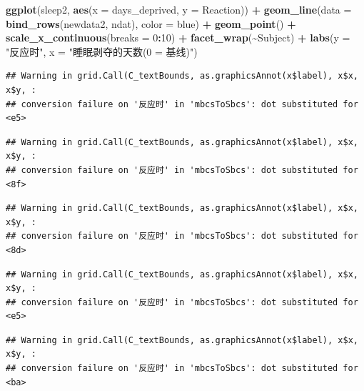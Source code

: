 \documentclass[
]{book}
\newenvironment{Shaded}{\begin{snugshade}}{\end{snugshade}}
\newcommand{\AttributeTok}[1]{\textcolor[rgb]{0.13,0.29,0.53}{#1}}
\newcommand{\DecValTok}[1]{\textcolor[rgb]{0.00,0.00,0.81}{#1}}
\newcommand{\FunctionTok}[1]{\textcolor[rgb]{0.13,0.29,0.53}{\textbf{#1}}}
\newcommand{\NormalTok}[1]{#1}
\newcommand{\SpecialCharTok}[1]{\textcolor[rgb]{0.81,0.36,0.00}{\textbf{#1}}}
\newcommand{\StringTok}[1]{\textcolor[rgb]{0.31,0.60,0.02}{#1}}
\begin{document}
\begin{Shaded}
\begin{Highlighting}[]
\FunctionTok{ggplot}\NormalTok{(sleep2, }\FunctionTok{aes}\NormalTok{(}\AttributeTok{x =}\NormalTok{ days\_deprived, }\AttributeTok{y =}\NormalTok{ Reaction)) }\SpecialCharTok{+}
  \FunctionTok{geom\_line}\NormalTok{(}\AttributeTok{data =} \FunctionTok{bind\_rows}\NormalTok{(newdata2, ndat),}
            \AttributeTok{color =} \StringTok{\textquotesingle{}blue\textquotesingle{}}\NormalTok{) }\SpecialCharTok{+}
  \FunctionTok{geom\_point}\NormalTok{() }\SpecialCharTok{+}
  \FunctionTok{scale\_x\_continuous}\NormalTok{(}\AttributeTok{breaks =} \DecValTok{0}\SpecialCharTok{:}\DecValTok{10}\NormalTok{) }\SpecialCharTok{+}
  \FunctionTok{facet\_wrap}\NormalTok{(}\SpecialCharTok{\textasciitilde{}}\NormalTok{Subject) }\SpecialCharTok{+}
  \FunctionTok{labs}\NormalTok{(}\AttributeTok{y =} \StringTok{"反应时"}\NormalTok{, }\AttributeTok{x =} \StringTok{"睡眠剥夺的天数(0 = 基线)"}\NormalTok{)}
\end{Highlighting}
\end{Shaded}

\begin{verbatim}
## Warning in grid.Call(C_textBounds, as.graphicsAnnot(x$label), x$x, x$y, :
## conversion failure on '反应时' in 'mbcsToSbcs': dot substituted for <e5>
\end{verbatim}

\begin{verbatim}
## Warning in grid.Call(C_textBounds, as.graphicsAnnot(x$label), x$x, x$y, :
## conversion failure on '反应时' in 'mbcsToSbcs': dot substituted for <8f>
\end{verbatim}

\begin{verbatim}
## Warning in grid.Call(C_textBounds, as.graphicsAnnot(x$label), x$x, x$y, :
## conversion failure on '反应时' in 'mbcsToSbcs': dot substituted for <8d>
\end{verbatim}

\begin{verbatim}
## Warning in grid.Call(C_textBounds, as.graphicsAnnot(x$label), x$x, x$y, :
## conversion failure on '反应时' in 'mbcsToSbcs': dot substituted for <e5>
\end{verbatim}

\begin{verbatim}
## Warning in grid.Call(C_textBounds, as.graphicsAnnot(x$label), x$x, x$y, :
## conversion failure on '反应时' in 'mbcsToSbcs': dot substituted for <ba>
\end{verbatim}
\end{document}
